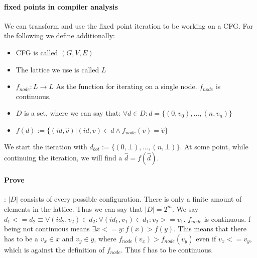 \paragraph{fixed points in compiler analysis}
We can transform and use the fixed point iteration to be working on a CFG. For the following we define additionally:
\begin{itemize}
	\item CFG is called $(G,V,E)$
	\item The lattice we use is called $L$
	\item $f _{node}:L \rightarrow L$ As the function for iterating on a single node. $f _{node}$ is continuous.
	\item $D$ is a set, where we can say that: $\forall d \in D: d = \{(0, v_0), ... , (n, v_n)\}$
	\item $f(d) := \{(id, \hat{v})| (id, v) \in d \wedge f _{node}(v) = \hat{v}\}$
\end{itemize}

We start the iteration with $d_{bot} := \{(0,\bot), ..., (n, \bot)\}$. At some point, while continuing the iteration, we will find a $\hat{d} = f(\hat{d})$. 

\paragraph{Prove}: $|D|$ consists of every possible configuration. There is only a finite amount of elements in the lattice. Thus we can say that $|D|=2^m$. \newline
We say $d_1 <= d_2 \equiv \forall (id_2, v_2) \in d_2: \forall (id_1, v_1) \in d_1 : v_2 >= v_1$. $f_{node}$ is continuous. \newline
f being not continuous means $\exists x <= y: f(x) > f(y)$.
This means that there has to be a $v_x \in x$ and $v_y \in y$, where $f_{node}(v_x) > f_{node}(v_y)$ even if $v_x <= v_y$, which is against the definition of $f_{node}$. Thus f has to be continuous.
